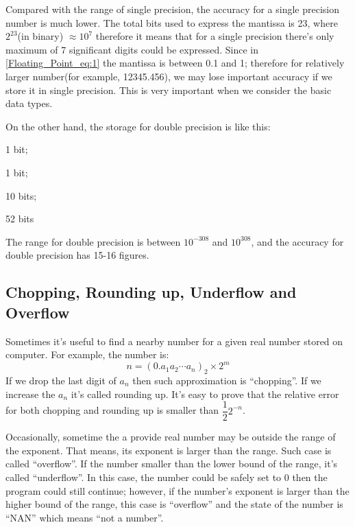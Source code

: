 Compared with the range of single precision, the accuracy for a single
precision number is much lower. The total bits used to express the 
mantissa is 23, where $2^{23}$(in binary) $\approx 10^{7}$ therefore it means that
for a single precision there's only maximum of 7 significant digits 
could be expressed. Since in \ref{Floating_Point_eq:1} the mantissa is between
0.1 and 1; therefore for relatively larger number(for example, 12345.456),
we may lose important accuracy if we store it in single precision. This is
very important when we consider the basic data types.

On the other hand, the storage for double precision is like this:
\begin{description}
 \centering
 \item[Sign of mantessa] 1 bit;
 \item[Sign of exponent] 1 bit;
 \item[exponent($|m|$)]  10 bits;
 \item[mantissa($|q|$)]  52 bits
\end{description}
The range for double precision is between $10^{-308}$ and $10^{308}$, and the 
accuracy for double precision has 15-16 figures.

\subsection{Chopping, Rounding up, Underflow and Overflow}
%
%
Sometimes it's useful to find a nearby number for a given real number stored on
computer. For example, the number is:
\begin{equation}
 n = (0.a_{1}a_{2}\cdots a_{n})_{2}\times 2^{m}
\end{equation}
If we drop the last digit of $a_{n}$ then such approximation is ``chopping''. If we 
increase the $a_{n}$ it's called rounding up. It's easy to prove that the relative 
error for both chopping and rounding up is smaller than $\dfrac{1}{2}2^{-n}$. 

Occasionally, sometime the a provide real number may be outside the range of the 
exponent. That means, its exponent is larger than the range. Such case is called 
``overflow''. If the number smaller than the lower bound of the range, it's called
``underflow''. In this case, the number could be safely set to 0 then the program
could still continue; however, if the number's exponent is larger than the higher 
bound of the range, this case is ``overflow'' and the state of the number is ``NAN''
which means ``not a number''.

